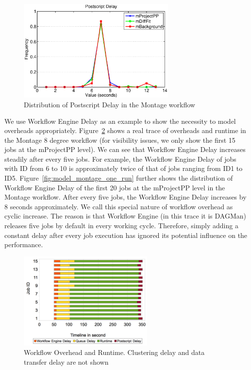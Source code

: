 \begin{figure}[h!]
	\centering
\includegraphics[width=0.7\textwidth]{figures/model/postscript_delay.eps}
    \caption{Distribution of Postscript Delay in the Montage workflow}
    \label{fig:model_montage_postscript_delay}
\end{figure}

We use Workflow Engine Delay as an example to show the necessity to model overheads appropriately. Figure~\ref{fig:model_montage_timeline} shows a real trace of overheads and runtime in the Montage 8 degree workflow (for visibility issues, we only show the first 15 jobs at the mProjectPP level). We can see that Workflow Engine Delay increases steadily after every five jobs. For example, the Workflow Engine Delay of jobs with ID from 6 to 10 is approximately twice of that of jobs ranging from ID1 to ID5. Figure~\ref{fig:model_montage_one_run} further shows the distribution of Workflow Engine Delay of the first 20 jobs at the mProjectPP level in the Montage workflow. After every five jobs, the Workflow Engine Delay increases by 8 seconds approximately. We call this special nature of workflow overhead as cyclic increase. The reason is that Workflow Engine (in this trace it is DAGMan) releases five jobs by default in every working cycle. Therefore, simply adding a constant delay after every job execution has ignored its potential influence on the performance.

\begin{figure}[h!]
	\centering
    \includegraphics[width=0.6\textwidth]{figures/model/overhead_timeline2.pdf}
    \caption{Workflow Overhead and Runtime. Clustering delay and data transfer delay are not shown}
    \label{fig:model_montage_timeline}
\end{figure}


